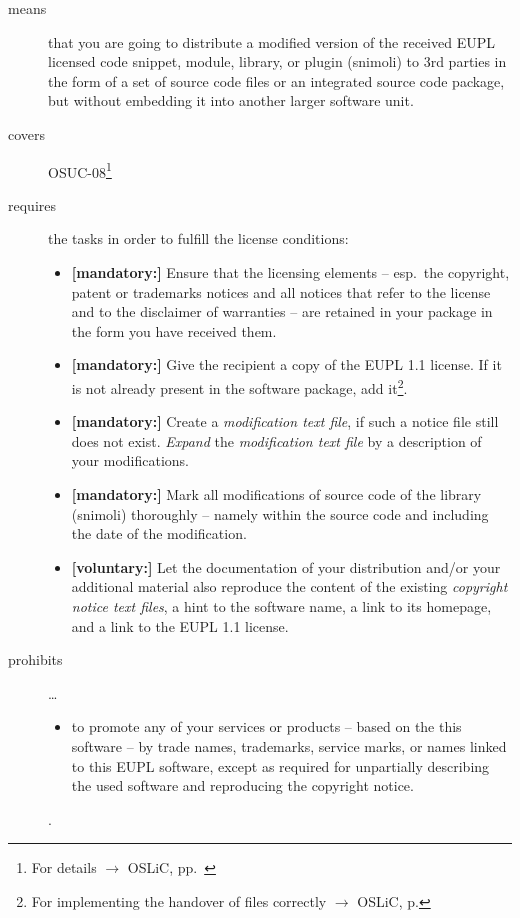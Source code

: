 \begin{description}
\item[means] that you are going to distribute a modified version of the received
EUPL licensed code snippet, module, library, or plugin (snimoli) to 3rd
parties in the form of a set of source code files or an integrated source code
package, but without embedding it into another larger software unit.
\item[covers] OSUC-08\footnote{For details $\rightarrow$ OSLiC, pp.\ \pageref{OSUC-08-DEF}}
\item[requires] the tasks in order to fulfill the license conditions:
\begin{itemize}
  
  \item \textbf{[mandatory:]} Ensure that the licensing elements -- esp.\ the
  copyright, patent or trademarks notices and all notices that refer to the
  license and to the disclaimer of warranties -- are retained in your package in
  the form you have received them.
  
  \item \textbf{[mandatory:]} Give the recipient a copy of the EUPL 1.1
  license. If it is not already present in the software package, add
  it\footnote{For implementing the handover of files correctly $\rightarrow$
  OSLiC, p. \pageref{DistributingFilesHint}}.

  \item \textbf{[mandatory:]} Create a \emph{modification text file}, if such a
  notice file still does not exist. \emph{Expand} the \emph{modification text
  file} by a description of your modifications.
  
  \item \textbf{[mandatory:]} Mark all modifications of source code of the
  library (snimoli) thoroughly -- namely within the source code and including
  the date of the modification.
   
  \item \textbf{[voluntary:]} Let the documentation of your distribution and/or
  your additional material  also reproduce the content of the existing
  \emph{copyright notice text files}, a hint to the software name, a link to its
  homepage, and a link to the EUPL 1.1 license.

\end{itemize}

\item[prohibits] \ldots
\begin{itemize}
  \item to promote any of your services or products -- based on the this software
  -- by trade names, trademarks, service marks, or names linked to this EUPL
  software, except as required for unpartially describing the used software and
  reproducing the copyright notice.
\end{itemize}.

\end{description}


